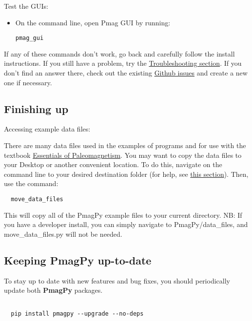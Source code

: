 \documentclass[11pt]{article}
\begin{document}
Test the GUIs:

\begin{itemize}
\item  On the command line, open Pmag GUI by running:

\begin{verbatim}
pmag_gui
\end{verbatim}

\end{itemize}

If any of these commands don't work, go back and carefully follow the install instructions.  If you still have a problem, try the \href{https://earthref.org/PmagPy/cookbook/#trouble}{Troubleshooting section}.  If you don't find an answer there, check out the existing \href{https://github.com/PmagPy/PmagPy/issues}{Github issues} and create a new one if necessary.

\subsection{Finishing up}

Accessing example data files:

   There are many data files used in the examples of programs and for use with the textbook  \href{http://earthref.org/MAGIC/books/Tauxe/Essentials/WebBook3.html}{Essentials of Paleomagnetism}.     You may want to copy  the data files to your Desktop or another convenient location.
   To do this, navigate on the command line to your desired destination folder (for help, see \href{https://earthref.org/PmagPy/cookbook/#file_system}{this section}).  Then, use the command:

\begin{verbatim}
  move_data_files
\end{verbatim}

This will copy all of the PmagPy example files to your current directory.  NB: If you have a developer install, you can simply navigate to PmagPy/data\_files, and move\_data\_files.py will not be needed.


\subsection{Keeping PmagPy up-to-date}


To stay up to date with new features and bug fixes, you should periodically update both {\bf PmagPy} packages.
\begin{verbatim}

  pip install pmagpy --upgrade --no-deps
\end{verbatim}
\end{document}
